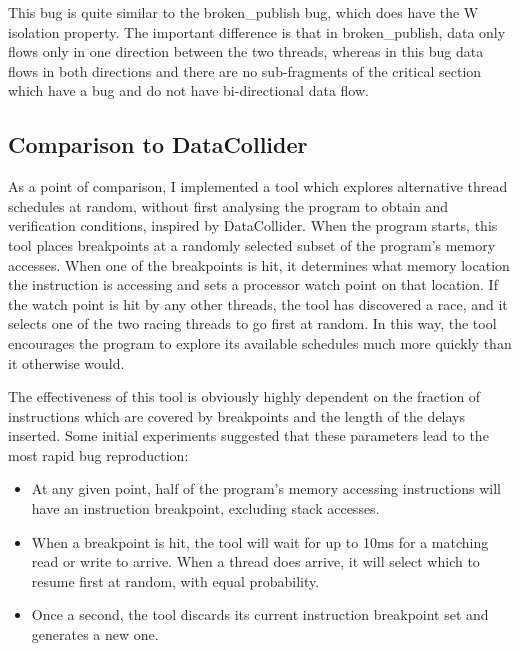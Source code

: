 This bug is quite similar to the broken\_publish bug, which does have
the W isolation property.  The important difference is that in
broken\_publish, data only flows only in one direction between the two
threads, whereas in this bug data flows in both directions and there
are no sub-fragments of the critical section which have a bug and do
not have bi-directional data flow.

\subsection{Comparison to DataCollider}
\label{sect:eval:datacollider}

As a point of comparison, I implemented a tool which explores
alternative thread schedules at random, without first analysing the
program to obtain {\StateMachines} and verification conditions,
inspired by DataCollider\needCite{}.  When the program starts, this
tool places breakpoints at a randomly selected subset of the program's
memory accesses.  When one of the breakpoints is hit, it determines
what memory location the instruction is accessing and sets a processor
watch point\needCite{} on that location.  If the watch point is hit by
any other threads, the tool has discovered a race, and it selects one
of the two racing threads to go first at random.  In this way, the
tool encourages the program to explore its available schedules much
more quickly than it otherwise would.

The effectiveness of this tool is obviously highly dependent on the
fraction of instructions which are covered by breakpoints and the
length of the delays inserted.  Some initial experiments suggested that these parameters lead
to the most rapid bug reproduction:

\begin{itemize}
\item
  At any given point, half of the program's memory accessing
  instructions will have an instruction breakpoint, excluding stack
  accesses.
\item
  When a breakpoint is hit, the tool will wait for up to 10ms for a
  matching read or write to arrive.  When a thread does arrive, it
  will select which to resume first at random, with equal probability.
\item
  Once a second, the tool discards its current instruction breakpoint
  set and generates a new one.
\end{itemize}

